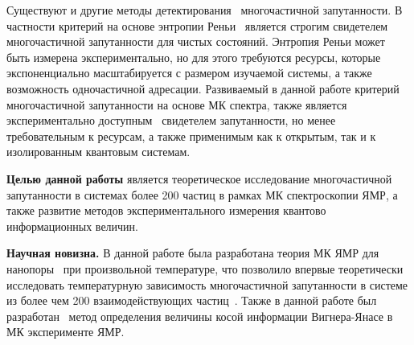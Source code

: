 Существуют и другие методы детектирования~\cite{Guhne2009} многочастичной запутанности.
В частности критерий на основе энтропии Реньи~\cite{Hosur2016, Fan2017}
является строгим свидетелем многочастичной запутанности для чистых состояний.
Энтропия Реньи может быть измерена экспериментально,
но для этого требуются ресурсы,
которые экспоненциально масштабируется с размером изучаемой системы,
а также возможность одночастичной адресации.
Развиваемый в данной работе критерий многочастичной запутанности на основе МК спектра,
также является экспериментально доступным~\cite{Baum1985} свидетелем запутанности,
но менее требовательным к ресурсам,
а также применимым как к открытым,
так и к изолированным квантовым системам.


\textbf{Целью данной работы} является теоретическое исследование многочастичной запутанности в системах более 200 частиц в рамках МК спектроскопии ЯМР,
а также развитие методов экспериментального измерения квантово информационных величин.


\textbf{Научная новизна.}
В данной работе была разработана теория МК ЯМР для нанопоры~\cite{Doronin2019} при произвольной температуре,
что позволило впервые теоретически исследовать температурную зависимость многочастичной запутанности в системе из более чем 200 взаимодействующих частиц~\cite{Doronin2019, Lazarev2020}.
Также в данной работе был разработан~\cite{Doronin2021} метод определения величины косой информации Вигнера-Янасе в МК эксперименте ЯМР.

